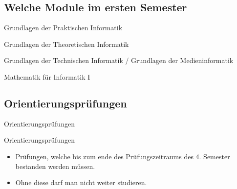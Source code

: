 \documentclass[
	aspectratio=169, 
	8pt 
]{beamer}
\begin{document}
\subsection{Welche Module im ersten Semester}

\begin{frame}{\insertsubsection}
    \begin{fancycolumns}
        \begin{gdpi}{} Grundlagen der Praktischen Informatik\newline\end{gdpi}
        \begin{gdti}{} Grundlagen der Theoretischen Informatik\newline\end{gdti}

        \nextcolumn
        \begin{gdtech}{} Grundlagen der Technischen Informatik / \newline Grundlagen der Medieninformatik\end{gdtech}
        \begin{mathb}{} Mathematik für Informatik I\newline\end{mathb}
    \end{fancycolumns}
\end{frame}

\subsection{Orientierungsprüfungen}
\begin{frame}{Orientierungsprüfungen}
    \begin{definition}{Orientierungsprüfungen}
        \begin{itemize}
            \item Prüfungen, welche bis zum ende des Prüfungszeitraums des 4. Semester bestanden werden müssen. 
            \item Ohne diese darf man nicht weiter studieren.
        \end{itemize}
    \end{definition}
\end{frame}
\end{document}
